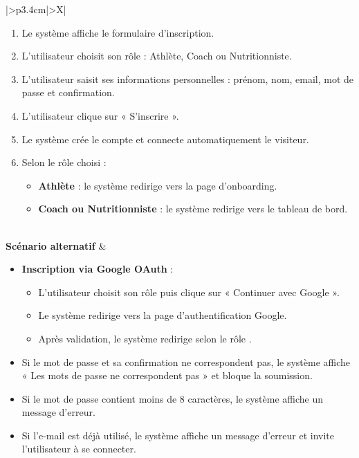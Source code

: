 ﻿\documentclass[a4paper,12pt]{report}
\begin{document}
\begin{table}[H]
\begin{tabularx}{\textwidth}{|>{\RaggedRight\arraybackslash}p{3.4cm}|>{\RaggedRight\arraybackslash}X|}
\begin{minipage}[t]{\linewidth}
\begin{enumerate}[label=\arabic*., leftmargin=*, topsep=0pt, itemsep=1pt]
    \item Le système affiche le formulaire d'inscription.
    \item L'utilisateur choisit son rôle : Athlète, Coach ou Nutritionniste. 
    \item L'utilisateur saisit ses informations personnelles : prénom, nom, email, mot de passe et confirmation. 
    \item L'utilisateur clique sur « S'inscrire ».
    \item Le système crée le compte et connecte automatiquement le visiteur.
    \item Selon le rôle choisi :
    \begin{itemize}[leftmargin=*, topsep=1pt, itemsep=1pt]
        \item \textbf{Athlète} : le système redirige vers la page d'onboarding.
        \item \textbf{Coach ou Nutritionniste} : le système redirige vers le tableau de bord.
    \end{itemize}
\end{enumerate}
\vspace{2pt}
\end{minipage} \\
\hline
\textbf{Scénario alternatif} &
\begin{minipage}[t]{\linewidth}
\vspace{2pt}
\begin{itemize}[leftmargin=*, topsep=0pt, itemsep=1pt]
    \item \textbf{Inscription via Google OAuth} :
    \begin{itemize}[leftmargin=*, topsep=1pt, itemsep=1pt]
        \item L'utilisateur choisit son rôle 
puis clique sur « Continuer avec Google ».
        \item Le système redirige vers la page d'authentification Google.
        \item Après validation, le système redirige selon le rôle .
    \end{itemize}
    \item  Si le  mot de passe et sa confirmation ne correspondent pas, le système affiche « Les mots de passe ne correspondent pas » et bloque la soumission.
    \item Si le mot de passe contient moins de 8 caractères, le système affiche un message d'erreur.
    \item  Si l'e-mail est déjà utilisé, le système affiche un message d'erreur et invite l'utilisateur à se connecter.
\end{itemize}
\vspace{2pt}
\end{minipage} \\
\hline
\end{tabularx}
\fussy
\end{table}
\end{document}
